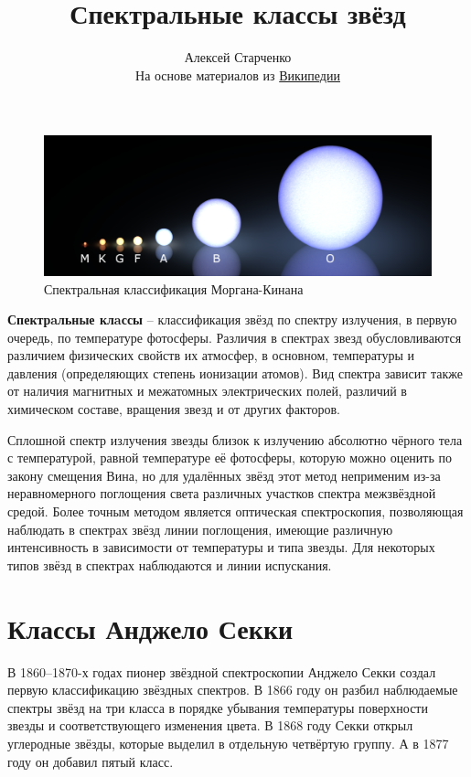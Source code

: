 \documentclass[12pt,a4paper]{article}
\author{Алексей Старченко \\ На основе материалов из \href{https://ru.wikipedia.org/wiki/\%D0\%A1\%D0\%BF\%D0\%B5\%D0\%BA\%D1\%82\%D1\%80\%D0\%B0\%D0\%BB\%D1\%8C\%D0\%BD\%D1\%8B\%D0\%B5_\%D0\%BA\%D0\%BB\%D0\%B0\%D1\%81\%D1\%81\%D1\%8B_\%D0\%B7\%D0\%B2\%D1\%91\%D0\%B7\%D0\%B4}{Википедии}}
\title{Спектральные классы звёзд}
\begin{document}
\maketitle

\tableofcontents \hspace{1pt}

\begin{figure}
\includegraphics[scale=0.105]{1.png}
{\footnotesize Спектральная классификация Моргана-Кинана}
\end{figure} 


\textbf{Спектрaльные клaссы} -- классификация звёзд по спектру излучения, в первую очередь, по температуре фотосферы. Различия в спектрах звезд обусловливаются различием физических свойств их атмосфер, в основном, температуры и давления (определяющих степень ионизации атомов). Вид спектра зависит также от наличия магнитных и межатомных электрических полей, различий в химическом составе, вращения звезд и от других факторов.

Сплошной спектр излучения звезды близок к излучению абсолютно чёрного тела с температурой, равной температуре её фотосферы, которую можно оценить по закону смещения Вина, но для удалённых звёзд этот метод неприменим из-за неравномерного поглощения света различных участков спектра межзвёздной средой. Более точным методом является оптическая спектроскопия, позволяющая наблюдать в спектрах звёзд линии поглощения, имеющие различную интенсивность в зависимости от температуры и типа звезды. Для некоторых типов звёзд в спектрах наблюдаются и линии испускания.


\section{Классы Анджело Секки}
В 1860--1870-х годах пионер звёздной спектроскопии Анджело Секки создал первую классификацию звёздных спектров. В 1866 году он разбил наблюдаемые спектры звёзд на три класса в порядке убывания температуры поверхности звезды и соответствующего изменения цвета\cite{2}\cite{3}. В 1868 году Секки открыл углеродные звёзды, которые выделил в отдельную четвёртую группу\cite{4}. А в 1877 году он добавил пятый класс\cite{5}.
\end{document}
